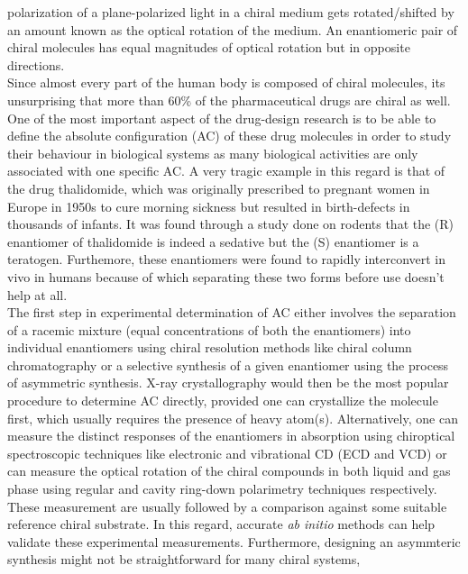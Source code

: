 polarization of a plane-polarized light in a chiral medium gets rotated/shifted by an amount known as 
the optical rotation of the medium. An enantiomeric pair of chiral molecules has equal magnitudes of 
optical rotation but in opposite directions.\\
Since almost every part of the human body is composed of chiral molecules, its unsurprising that
more than 60\% of the pharmaceutical drugs are chiral as well. One of the most 
important aspect of the drug-design research is to be able to define the absolute configuration 
(AC) of these drug molecules in order to study their behaviour in biological systems as 
many biological activities are only associated with one specific AC. A very tragic example
in this regard is that of the drug thalidomide, which was originally prescribed to pregnant women in 
Europe in 1950s to cure morning sickness but resulted in birth-defects in thousands of 
infants. It was found through a study done on rodents that the (R) enantiomer of thalidomide is indeed 
a sedative but the (S) enantiomer is a teratogen\cite{Crawford06}. Furthemore, these enantiomers were 
found to rapidly interconvert in vivo in humans because of which separating 
these two forms before use doesn't help at all.
\\
The first step in experimental determination of AC either involves the separation of 
a racemic mixture (equal concentrations of both the enantiomers) into individual enantiomers
using chiral resolution methods like chiral column chromatography or a selective synthesis
of a given enantiomer using the process of asymmetric synthesis. X-ray crystallography would then be the 
most popular procedure to determine AC directly, provided one can crystallize the molecule first, which usually 
requires the presence of heavy atom(s). Alternatively, one can measure the distinct responses of 
the enantiomers in absorption using chiroptical spectroscopic techniques like electronic and vibrational 
CD (ECD and VCD) or can measure the optical rotation of the chiral compounds in both liquid 
and gas phase using regular and cavity ring-down polarimetry techniques\cite{Muller00} respectively.
These measurement are usually followed by a comparison against some suitable reference chiral
substrate. In this regard, accurate {\em ab initio} methods can help validate these experimental measurements.
Furthermore, designing an asymmteric synthesis might not be straightforward for many chiral systems, 
